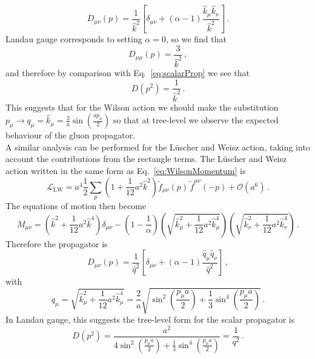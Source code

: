 %
\begin{equation}
D_{\mu\nu}(p) = \frac{1}{\hat{k}^2}\left[\delta_{\mu\nu} + (\alpha-1)\frac{\hat{k}_\mu \hat{k}_\nu}{\hat{k}^2}\right]\, .
\end{equation}
Landau gauge corresponds to setting $\alpha=0$, so we find that
%
\begin{equation}
D_{\mu\mu}(p) = \frac{3}{\hat{k}^2}\, ,
\end{equation}
%
and therefore by comparison with Eq.~\ref{eq:scalarProp} we see that
%
\begin{equation}
D(p^2) = \frac{1}{\hat{k}^2}\, .
\end{equation}
%
This suggests that for the Wilson action we should make the substitution $p_\mu\rightarrow q_\mu = \hat{k}_\mu = \frac{2}{a}\sin\left(\frac{a p_\mu}{2}\right)$ so that at tree-level we observe the expected behaviour of the gluon propagator.\\

A similar analysis can be performed for the L\"uscher and Weisz action, taking into account the contributions from the rectangle terms. The L\"uscher and Weisz action written in the same form as Eq.~\ref{eq:WilsonMomentum} is~\cite{Weisz:1982zw}
%
\begin{equation}
\mathcal{L}_\text{LW} = a^4\frac{1}{2}\sum_p \left(1+\frac{1}{12}a^2\hat{k}^2\right) \tilde{f}_{\mu\nu}(p) \, \tilde{f}^{\mu\nu}(-p) + \mathcal{O}(a^6)\, .
\end{equation}
%
The equations of motion then become
%
\begin{equation}
M_{\mu\nu} = \left(\hat{k}^2 + \frac{1}{12}a^2\hat{k}^4\right)\delta_{\mu\nu} - \left(1-\frac{1}{\alpha}\right)\left(\sqrt{\hat{k}_\mu^2 + \frac{1}{12}a^2\hat{k}_\mu^4}\right)\left(\sqrt{\hat{k}_\nu^2 + \frac{1}{12}a^2\hat{k}_\nu^4}\right)\, .
\end{equation}
Therefore the propagator is
%
\begin{equation}
D_{\mu\nu}(p) = \frac{1}{\hat{q}^2}\left[\delta_{\mu\nu} + (\alpha-1)\frac{\hat{q}_\mu \hat{q}_\nu}{\hat{q}^2}\right]\, ,
\end{equation}
with
\begin{equation}
q_\mu = \sqrt{\hat{k}_\mu^2 + \frac{1}{12}a^2\hat{k}_\mu^4} = \frac{2}{a}\sqrt { \sin ^ { 2 } \left( \frac { p _ { \mu } a } { 2 } \right) + \frac { 1 } { 3 } \sin ^ { 4 } \left( \frac { p _ { \mu } a } { 2 } \right) }\, .
\end{equation}
%
In Landau gauge, this suggests the tree-level form for the scalar propagator is
%
\begin{equation}
D(p^2) = \frac{a^2}{4 \sin ^ { 2 } \left( \frac { p _ { \mu } a } { 2 } \right) + \frac { 1 } { 3 } \sin ^ { 4 } \left( \frac { p _ { \mu } a } { 2 } \right)} = \frac{1}{q^2}\, .
\label{eq:LWCorrection}
\end{equation}\\


